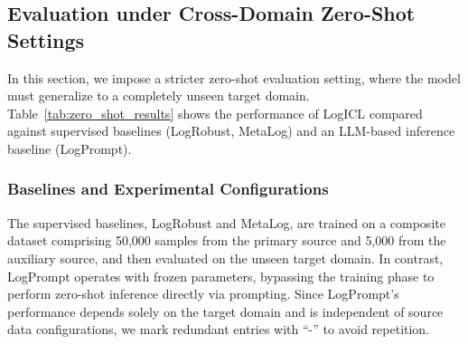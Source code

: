 \documentclass[lettersize,journal]{IEEEtran}
\begin{document}
\subsection{Evaluation under Cross-Domain Zero-Shot Settings}

In this section, we impose a stricter zero-shot evaluation setting, where the model must generalize to a completely unseen target domain. Table~\ref{tab:zero_shot_results} shows the performance of LogICL compared against supervised baselines (LogRobust, MetaLog) and an LLM-based inference baseline (LogPrompt).

\subsubsection{Baselines and Experimental Configurations}
The supervised baselines, LogRobust and MetaLog, are trained on a composite dataset comprising 50,000 samples from the primary source and 5,000 from the auxiliary source, and then evaluated on the unseen target domain. In contrast, LogPrompt operates with frozen parameters, bypassing the training phase to perform zero-shot inference directly via prompting. Since LogPrompt’s performance depends solely on the target domain and is independent of source data configurations, we mark redundant entries with ``-'' to avoid repetition.

\end{document}
